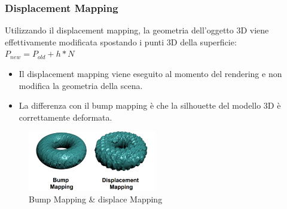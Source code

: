 \subsubsection{Displacement Mapping}
Utilizzando il displacement mapping, la geometria dell'oggetto 3D viene effettivamente modificata spostando i punti 3D della superficie:
$P_{new}=P_{old} + h*N $ \\
\begin{itemize}
    \item Il displacement mapping viene eseguito al momento del rendering e non modifica la geometria della scena.
    \item La differenza con il bump mapping è che la silhouette del modello 3D è correttamente deformata.
\end{itemize}
\begin{figure}[H]
    \centering
    \includegraphics[width=0.5\textwidth]{images/BumpMap.png} 
    \caption{Bump Mapping \& displace Mapping}
    \label{fig:immagine}
\end{figure}